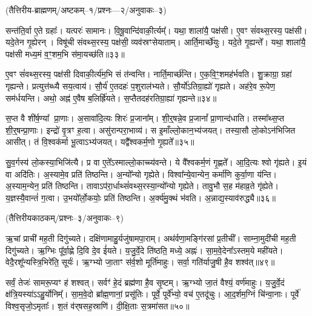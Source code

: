 \centerline{\scriptsize(तैत्तिरीय-ब्राह्मणम्/अष्टकम्–१/प्रश्नः—२/अनुवाकः–३)}

सन्त॑ति॒र्वा ए॒ते ग्रहाः᳚।
यत्परः॑ सामानः।
वि॒षू॒वान्दि॑वा\-की॒र्त्यम्᳚।
यथा॒ शाला॑यै॒ पक्ष॑सी।
ए॒वꣳ सं॑वथ्स॒रस्य॒ पक्ष॑सी।
यदे॒तेन गृ॒ह्येरन्।
विषू॑ची संवथ्स॒रस्य॒ पक्ष॑सी॒ व्यव॑स्रꣳसेयाताम्।
आर्ति॒मार्च्छे॑युः।
यदे॒ते गृ॒ह्यन्ते᳚।
यथा॒ शाला॑यै॒ पक्ष॑सी मध्य॒मं व॒ꣳ॒शम॒भि स॑मा॒यच्छ॑ति॥३३॥

ए॒वꣳ सं॑वथ्स॒रस्य॒ पक्ष॑सी दिवाकी॒र्त्य॑म॒भि सं त॑न्वन्ति।
नार्ति॒मार्च्छ॑न्ति।
ए॒क॒वि॒ꣳ॒शमह॑र्भवति।
शु॒क्राग्रा॒ ग्रहा॑ गृह्यन्ते।
प्रत्युत्त॑ब्ध्यै सय॒त्वाय॑।
सौ॒र्य॑ ए॒तदहः॑ प॒शुराल॑भ्यते।
सौ॒र्यो॑\-ऽतिग्रा॒ह्यो॑ गृह्यते।
अह॑रे॒व रू॒पेण॒ सम॑र्धयन्ति।
अथो॒ अह्न॑ ए॒वैष ब॒लिर्\mbox{}ह्रि॑यते।
स॒प्तैतदह॑रतिग्रा॒ह्या॑ गृह्यन्ते॥३४॥

स॒प्त वै शी॑र्\mbox{}ष॒ण्या᳚ प्रा॒णाः।
अ॒सावा॑दि॒त्यः शिरः॑ प्र॒जाना᳚म्।
शी॒र्॒षन्ने॒व प्र॒जानां᳚ प्रा॒णान्द॑धाति।
तस्मा᳚थ्स॒प्त शी॒र्॒षन्प्रा॒णाः।
इन्द्रो॑ वृ॒त्रꣳ ह॒त्वा।
असु॑रान्परा॒भाव्य॑।
स इ॒माँल्लो॒कान॒भ्य॑जयत्।
तस्या॒सौ लो॒को\-ऽन॑भिजित आसीत्।
तं वि॒श्वक॑र्मा भू॒त्वा\-ऽभ्य॑जयत्।
यद्वै᳚श्वकर्म॒णो गृ॒ह्यते᳚॥३५॥

सु॒व॒र्गस्य॑ लो॒कस्या॒भिजि॑त्यै।
प्र वा ए॒ते᳚\-ऽस्माल्लो॒काच्च्य॑वन्ते।
ये वै᳚श्वकर्म॒णं गृ॒ह्णते᳚।
आ॒दि॒त्यः श्वो गृ॑ह्यते।
इ॒यं वा अदि॑तिः।
अ॒स्यामे॒व प्रति॑ तिष्ठन्ति।
अ॒न्यो᳚न्यो गृह्येते।
विश्वा᳚न्ये॒वान्येन॒ कर्मा॑णि कुर्वा॒णा य॑न्ति।
अ॒स्याम॒न्येन॒ प्रति॑ तिष्ठन्ति।
तावाऽप॑रा॒र्धाथ्सं॑वथ्स॒रस्या॒न्यो᳚न्यो गृह्येते।
तावु॒भौ स॒ह म॑हाव्र॒ते गृ॑ह्येते।
य॒ज्ञस्यै॒वान्तं॑ ग॒त्वा।
उ॒भयो᳚र्लो॒कयोः॒ प्रति॑ तिष्ठन्ति।
अ॒र्क्य॑मु॒क्थं भ॑वति।
अ॒न्नाद्य॒स्याव॑रुद्ध्यै॥३६॥



\centerline{\scriptsize(तैत्तिरीयकाठकम्/प्रश्नः–३/अनुवाकः–९)}

   ऋ॒चां प्राची॑ मह॒ती दिगु॑च्यते।
   दक्षि॑णामाहु॒र्यजु॑षामपा॒राम्।
   अथ॑र्वणा॒मङ्गि॑रसां प्र॒तीची᳚।
   साम्ना॒मुदी॑ची मह॒ती दिगु॑च्यते।
   ऋ॒ग्भिः पू᳚र्वा॒ह्णे दि॒वि दे॒व ई॑यते।
   य॒जु॒र्वे॒दे ति॑ष्ठति॒ मध्ये॒ अह्नः॑।
   सा॒म॒वे॒देना᳚ऽस्तम॒ये मही॑यते।
   वेदै॒रशू᳚न्यस्त्रि॒भिरे॑ति॒ सूर्यः॑।
   ऋ॒ग्भ्यो जा॒ताꣳ स॑र्व॒शो मूर्ति॑माहुः।
   सर्वा॒ गति॑र्याजु॒षी है॒व शश्व॑त्॥४९॥

   सर्वं॒ तेजः॑ सामरू॒प्यꣳ ह॑ शश्वत्।
   सर्वꣳ॑ हे॒दं ब्रह्म॑णा है॒व सृ॒ष्टम्।
   ऋ॒ग्भ्यो जा॒तं वैश्यं॒ वर्ण॑माहुः।
   य॒जु॒र्वे॒दं क्ष॑त्रि॒यस्या॑ऽऽहु॒र्योनिम्᳚।
   सा॒म॒वे॒दो ब्रा᳚ह्म॒णानां॒ प्रसू॑तिः।
   पूर्वे॒ पूर्वे᳚भ्यो॒ वच॑ ए॒तदू॑चुः।
   आ॒द॒र्\mbox{}शम॒ग्निं चि॑न्वा॒नाः।
   पूर्वे॑ विश्व॒सृजो॒ऽमृताः᳚।
   श॒तं व॑र्‌षसह॒स्राणि॑।
   दी॒क्षि॒ताः स॒त्रमा॑सत॥५०॥

